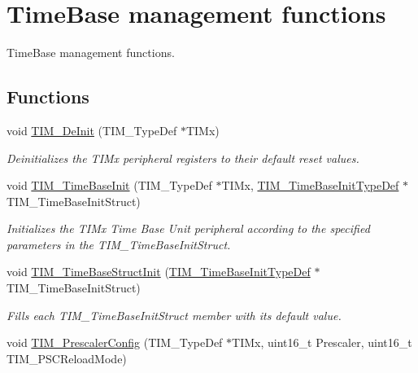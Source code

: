 \hypertarget{group___t_i_m___group1}{\section{Time\-Base management functions}
\label{group___t_i_m___group1}
}


Time\-Base management functions.  


\subsection*{Functions}
\begin{DoxyCompactItemize}
\item 
void \hyperlink{group___t_i_m___group1_ga1659cc0ce503ac151568e0c7c02b1ba5}{T\-I\-M\-\_\-\-De\-Init} (T\-I\-M\-\_\-\-Type\-Def $\ast$T\-I\-Mx)
\begin{DoxyCompactList}\small\item\em Deinitializes the T\-I\-Mx peripheral registers to their default reset values. \end{DoxyCompactList}\item 
void \hyperlink{group___t_i_m___group1_ga83fd58c9416802d9638bbe1715c98932}{T\-I\-M\-\_\-\-Time\-Base\-Init} (T\-I\-M\-\_\-\-Type\-Def $\ast$T\-I\-Mx, \hyperlink{struct_t_i_m___time_base_init_type_def}{T\-I\-M\-\_\-\-Time\-Base\-Init\-Type\-Def} $\ast$T\-I\-M\-\_\-\-Time\-Base\-Init\-Struct)
\begin{DoxyCompactList}\small\item\em Initializes the T\-I\-Mx Time Base Unit peripheral according to the specified parameters in the T\-I\-M\-\_\-\-Time\-Base\-Init\-Struct. \end{DoxyCompactList}\item 
void \hyperlink{group___t_i_m___group1_ga1556a0b9a5d53506875fd7de0cbc6b1f}{T\-I\-M\-\_\-\-Time\-Base\-Struct\-Init} (\hyperlink{struct_t_i_m___time_base_init_type_def}{T\-I\-M\-\_\-\-Time\-Base\-Init\-Type\-Def} $\ast$T\-I\-M\-\_\-\-Time\-Base\-Init\-Struct)
\begin{DoxyCompactList}\small\item\em Fills each T\-I\-M\-\_\-\-Time\-Base\-Init\-Struct member with its default value. \end{DoxyCompactList}\item 
void \hyperlink{group___t_i_m___group1_ga45c6fd9041baf7f64c121e0172f305c7}{T\-I\-M\-\_\-\-Prescaler\-Config} (T\-I\-M\-\_\-\-Type\-Def $\ast$T\-I\-Mx, uint16\-\_\-t Prescaler, uint16\-\_\-t T\-I\-M\-\_\-\-P\-S\-C\-Reload\-Mode)

\end{DoxyCompactItemize}
